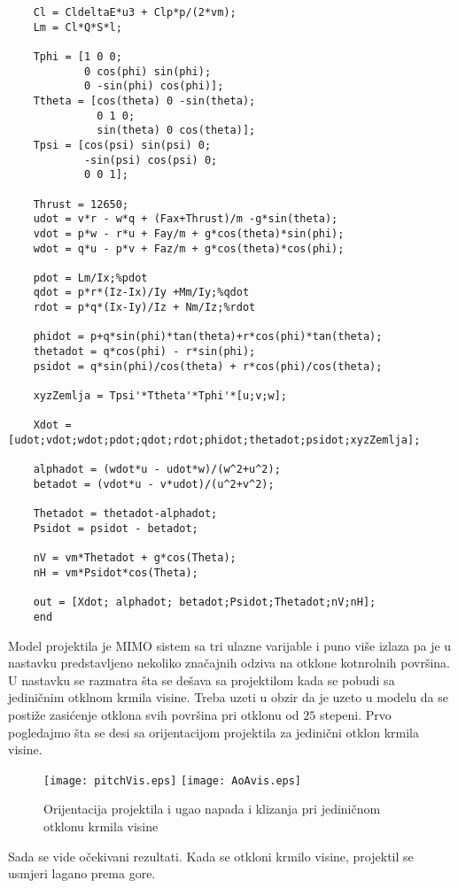 \begin{lstlisting}
    Cl = CldeltaE*u3 + Clp*p/(2*vm);
    Lm = Cl*Q*S*l;
    
    Tphi = [1 0 0;
            0 cos(phi) sin(phi);
            0 -sin(phi) cos(phi)];
    Ttheta = [cos(theta) 0 -sin(theta);
              0 1 0;
              sin(theta) 0 cos(theta)];
    Tpsi = [cos(psi) sin(psi) 0;
            -sin(psi) cos(psi) 0;
            0 0 1];
    
    Thrust = 12650;
    udot = v*r - w*q + (Fax+Thrust)/m -g*sin(theta);
    vdot = p*w - r*u + Fay/m + g*cos(theta)*sin(phi);
    wdot = q*u - p*v + Faz/m + g*cos(theta)*cos(phi);
    
    pdot = Lm/Ix;%pdot
    qdot = p*r*(Iz-Ix)/Iy +Mm/Iy;%qdot
    rdot = p*q*(Ix-Iy)/Iz + Nm/Iz;%rdot
    
    phidot = p+q*sin(phi)*tan(theta)+r*cos(phi)*tan(theta);
    thetadot = q*cos(phi) - r*sin(phi);
    psidot = q*sin(phi)/cos(theta) + r*cos(phi)/cos(theta);
    
    xyzZemlja = Tpsi'*Ttheta'*Tphi'*[u;v;w];
    
    Xdot = [udot;vdot;wdot;pdot;qdot;rdot;phidot;thetadot;psidot;xyzZemlja];
    
    alphadot = (wdot*u - udot*w)/(w^2+u^2);
    betadot = (vdot*u - v*udot)/(u^2+v^2);
    
    Thetadot = thetadot-alphadot;
    Psidot = psidot - betadot;
    
    nV = vm*Thetadot + g*cos(Theta);
    nH = vm*Psidot*cos(Theta);
    
    out = [Xdot; alphadot; betadot;Psidot;Thetadot;nV;nH];
    end
    \end{lstlisting}
Model projektila je MIMO sistem sa tri ulazne varijable i puno više izlaza pa je u nastavku 
predstavljeno nekoliko značajnih odziva na otklone kotnrolnih površina. U nastavku se razmatra 
šta se dešava sa projektilom kada se pobudi sa jediničnim otklnom krmila visine. Treba uzeti u obzir 
da je uzeto u modelu da se postiže zasićenje otklona svih površina pri otklonu od $25$ stepeni.
Prvo pogledajmo šta se desi sa orijentacijom projektila za jedinični otklon krmila visine. 
\begin{figure}[!ht]
    \centering
    \texttt{[image: pitchVis.eps]}
    \texttt{[image: AoAvis.eps]}
    \caption{Orijentacija projektila i ugao napada i klizanja pri jediničnom otklonu krmila 
    visine}
\end{figure}
Sada se vide očekivani rezultati. Kada se otkloni krmilo visine, projektil se usmjeri lagano prema gore. 
